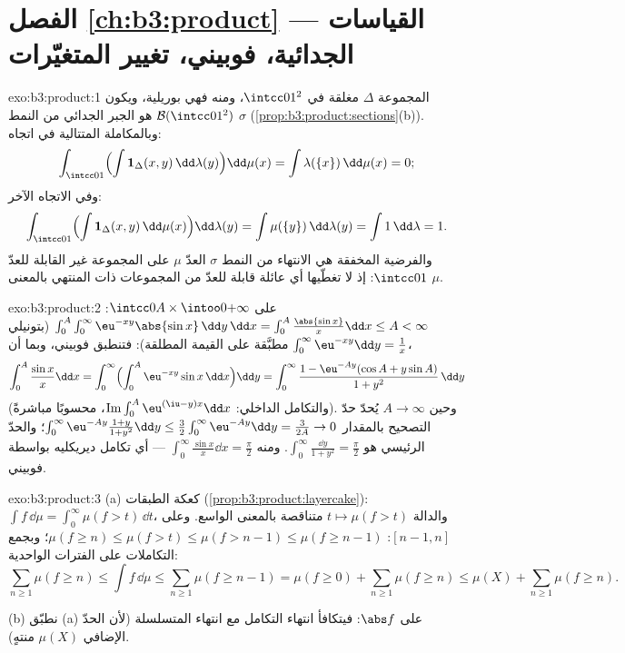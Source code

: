 \section*{الفصل \ref{ch:b3:product} --- القياسات الجدائية،
فوبيني، تغيير المتغيّرات}

\begin{solution}{exo:b3:product:1}
المجموعة $\Delta$ مغلقة في $\intcc01^2$، ومنه فهي بوريلية،
ويكون $\mathcal
B(\intcc01^2)$ هو الجبر الجدائي من النمط $\sigma$
(\cref{prop:b3:product:sections}(b)). وبالمكاملة المتتالية في اتجاه:
\[
\int_{\intcc01}\Bigl(\int \mathbf 1_\Delta(x,y)
\,\dd\lambda(y)\Bigr)\dd\mu(x)
= \int \lambda(\{x\})\,\dd\mu(x) = 0 ;
\]
وفي الاتجاه الآخر:
\[
\int_{\intcc01}\Bigl(\int\mathbf
1_\Delta(x,y)\,\dd\mu(x)\Bigr)\dd\lambda(y)
= \int \mu(\{y\})\,\dd\lambda(y) = \int 1\,\dd\lambda = 1 .
\]
والفرضية المخفقة هي الانتهاء من النمط $\sigma$  العدّ
$\mu$ على المجموعة غير القابلة للعدّ $\intcc01$: إذ لا تغطّيها أي
عائلة قابلة للعدّ من المجموعات ذات  المنتهي بالمعنى $\mu$.
\end{solution}

\begin{solution}{exo:b3:product:2}
على $\intcc0A\times\intoo0{+\infty}$:
$\int_0^A\int_0^\infty\eu^{-xy}\abs{\sin x}\,\dd y\,\dd x =
\int_0^A\frac{\abs{\sin x}}x\dd x \leq A < \infty$ (بتونيلي مطبَّقة
على القيمة المطلقة): فتنطبق فوبيني، وبما أن
$\int_0^\infty\eu^{-xy}\dd y = \frac1x$،
\[
\int_0^A\frac{\sin x}x\dd x
= \int_0^\infty\Bigl(\int_0^A\eu^{-xy}\sin x\,\dd
x\Bigr)\dd y
= \int_0^\infty \frac{1 - \eu^{-Ay}(\cos A + y\sin A)}{1 +
y^2}\,\dd y
\]
(والتكامل الداخلي: $\operatorname{Im}\int_0^A\eu^{(\iu -
y)x}\dd x$، محسوبًا مباشرةً). وحين $A \to \infty$
يُحدّ حدّ التصحيح بالمقدار $\int_0^\infty\eu^{-Ay}\frac{1 +
y}{1 + y^2}\dd y \leq \frac32\int_0^\infty\eu^{-Ay}\dd y =
\frac3{2A} \to 0$؛ والحدّ الرئيسي هو
$\int_0^\infty\frac{\dd y}{1+y^2} = \frac\pi2$. ومنه
$\int_0^\infty\frac{\sin x}x\dd x = \frac\pi2$ --- أي تكامل
ديريكليه بواسطة فوبيني.
\end{solution}

\begin{solution}{exo:b3:product:3}
(a) كعكة الطبقات (\cref{prop:b3:product:layercake}): $\int
f\,\dd\mu = \int_0^\infty\mu(f > t)\,\dd t$، والدالة $t \mapsto
\mu(f > t)$
متناقصة بالمعنى الواسع. وعلى $[n-1, n]$: $\mu(f \geq n)
\leq \mu(f > t) \leq \mu(f > n - 1) \leq \mu(f \geq n - 1)$؛ وبجمع
التكاملات على الفترات الواحدية:
\[
\sum_{n\geq1}\mu(f \geq n) \leq \int f\,\dd\mu \leq
\sum_{n\geq1}\mu(f \geq n - 1) = \mu(f \geq 0) +
\sum_{n\geq1}\mu(f\geq n) \leq \mu(X) + \sum_{n\geq1}\mu(f\geq
n).
\]

(b) نطبّق (a) على $\abs f$: فيتكافأ انتهاء التكامل مع انتهاء
المتسلسلة (لأن الحدّ الإضافي $\mu(X)$ منتهٍ).
\end{solution}

